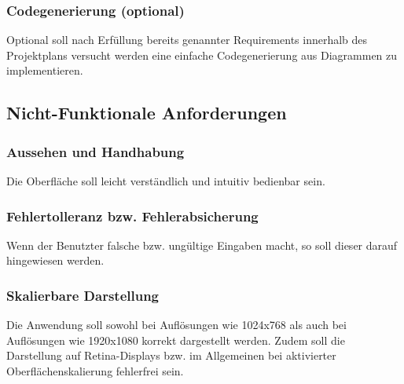 \subsubsection{Codegenerierung (optional)}
Optional soll nach Erfüllung bereits genannter Requirements innerhalb des Projektplans versucht werden eine einfache
Codegenerierung aus Diagrammen zu implementieren.



\subsection{Nicht-Funktionale Anforderungen}

\subsubsection{Aussehen und Handhabung}
Die Oberfläche soll leicht verständlich und intuitiv bedienbar sein.

\subsubsection{Fehlertolleranz bzw. Fehlerabsicherung}
Wenn der Benutzter falsche bzw. ungültige Eingaben macht, so soll dieser darauf hingewiesen werden.

\subsubsection{Skalierbare Darstellung}
Die Anwendung soll sowohl bei Auflösungen wie 1024x768 als auch bei Auflösungen wie 1920x1080 korrekt
dargestellt werden. Zudem soll die Darstellung auf Retina-Displays bzw. im Allgemeinen bei aktivierter
Oberflächenskalierung fehlerfrei sein.
